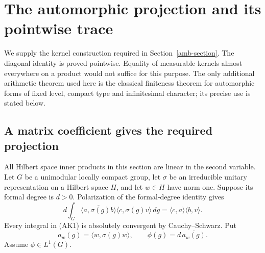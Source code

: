 \section{The automorphic projection and its pointwise trace}
\label{ak-section}

We supply the kernel construction required in
Section~\ref{amb-section}.  The diagonal identity is proved
pointwise.  Equality of measurable kernels almost everywhere
on a product would not suffice for this purpose.
The only additional arithmetic theorem used here is the
classical finiteness theorem for automorphic forms of fixed
level, compact type and infinitesimal character; its precise
use is stated below.

\subsection{A matrix coefficient gives the required projection}

All Hilbert space inner products in this section are linear
in the second variable.  Let \(G\) be a unimodular locally
compact group, let \(\sigma\) be an irreducible unitary
representation on a Hilbert space \(H\), and let \(w\in H\)
have norm one.  Suppose its formal degree is \(d>0\).
Polarization of the formal-degree identity gives
\[
 d\int_G\overline{\langle a,\sigma(g)b\rangle}
                 \langle c,\sigma(g)v\rangle\,dg
                       =\langle c,a\rangle\langle b,v\rangle .
 \tag{AK1}
\]
Every integral in (AK1) is absolutely convergent by
Cauchy--Schwarz.  Put
\[
 a_w(g)=\langle w,\sigma(g)w\rangle,\qquad
                   \phi(g)=d\,\overline{a_w(g)}.
 \tag{AK2}
\]
Assume \(\phi\in L^1(G)\).

